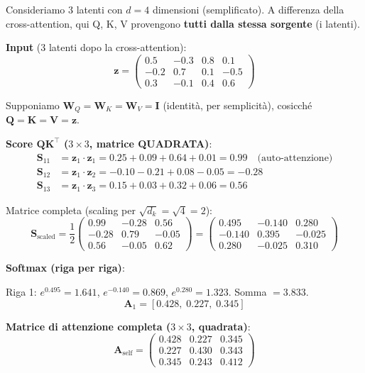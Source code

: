 \documentclass[12pt,a4paper]{article}
\begin{document}
\begin{examplebox}
Consideriamo 3 latenti con $d = 4$ dimensioni (semplificato). A differenza della cross-attention, qui Q, K, V provengono \textbf{tutti dalla stessa sorgente} (i latenti).

\textbf{Input} (3 latenti dopo la cross-attention):
\[
\mathbf{z} = \begin{pmatrix} 0.5 & -0.3 & 0.8 & 0.1 \\ -0.2 & 0.7 & 0.1 & -0.5 \\ 0.3 & -0.1 & 0.4 & 0.6 \end{pmatrix}
\]

Supponiamo $\mathbf{W}_Q = \mathbf{W}_K = \mathbf{W}_V = \mathbf{I}$ (identit\`a, per semplicit\`a), cosicch\'e $\mathbf{Q} = \mathbf{K} = \mathbf{V} = \mathbf{z}$.

\textbf{Score $\mathbf{Q}\mathbf{K}^\top$ ($3 \times 3$, matrice QUADRATA)}:
\begin{align*}
\mathbf{S}_{11} &= \mathbf{z}_1 \cdot \mathbf{z}_1 = 0.25 + 0.09 + 0.64 + 0.01 = 0.99 \quad \text{(auto-attenzione)} \\
\mathbf{S}_{12} &= \mathbf{z}_1 \cdot \mathbf{z}_2 = -0.10 - 0.21 + 0.08 - 0.05 = -0.28 \\
\mathbf{S}_{13} &= \mathbf{z}_1 \cdot \mathbf{z}_3 = 0.15 + 0.03 + 0.32 + 0.06 = 0.56
\end{align*}

Matrice completa (scaling per $\sqrt{d_k} = \sqrt{4} = 2$):
\[
\mathbf{S}_{\text{scaled}} = \frac{1}{2}\begin{pmatrix} 0.99 & -0.28 & 0.56 \\ -0.28 & 0.79 & -0.05 \\ 0.56 & -0.05 & 0.62 \end{pmatrix} = \begin{pmatrix} 0.495 & -0.140 & 0.280 \\ -0.140 & 0.395 & -0.025 \\ 0.280 & -0.025 & 0.310 \end{pmatrix}
\]

\textbf{Softmax (riga per riga)}:

Riga 1: $e^{0.495} = 1.641$, $e^{-0.140} = 0.869$, $e^{0.280} = 1.323$. Somma $= 3.833$.
\[
\mathbf{A}_1 = [0.428,\; 0.227,\; 0.345]
\]

\textbf{Matrice di attenzione completa ($3 \times 3$, quadrata)}:
\[
\mathbf{A}_{\text{self}} = \begin{pmatrix} 0.428 & 0.227 & 0.345 \\ 0.227 & 0.430 & 0.343 \\ 0.345 & 0.243 & 0.412 \end{pmatrix}
\]


\end{examplebox}
\end{document}
